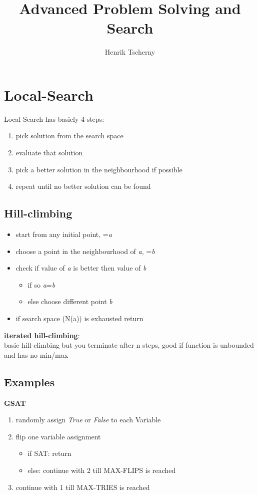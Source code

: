 \documentclass[12pt,a4paper]{article}
\title{Advanced Problem Solving and Search}
\author{Henrik Tscherny}
\begin{document}
\maketitle
\tableofcontents

\section{Local-Search}

Local-Search has basicly 4 steps:
\begin{enumerate}
\item pick solution from the search space
\item evaluate that solution
\item pick a better solution in the neighbourhood if possible
\item repeat until no better solution can be found
\end{enumerate}

\subsection{Hill-climbing}

\begin{itemize}
\item start from any initial point, =\textit{a}
\item choose a point in the neighbourhood of \textit{a},  =\textit{b}
\item check if value of \textit{a} is better then value of \textit{b}
\begin{itemize}
\item if so \textit{a}=\textit{b}
\item else choose different point \textit{b}
\end{itemize}
\item if search space (N(a)) is exhausted return
\end{itemize}
\textbf{iterated hill-climbing}:\\
basic hill-climbing but you terminate after n steps, good if function is unbounded and has no min/max\\





\subsection{Examples}
\textbf{GSAT}
\begin{enumerate}
\item randomly assign \textit{True} or \textit{False} to each Variable
\item flip one variable assignment
\begin{itemize}
\item if SAT: return
\item else: continue with 2 till MAX-FLIPS is reached
\end{itemize}
\item continue with 1 till MAX-TRIES is reached
\end{enumerate}
\end{document}
